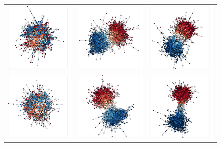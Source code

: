 \documentclass[11pt]{article}
\begin{document}
\begin{center}
\begin{figure}[H]
\begin{tabular}{ccc}
    \includegraphics[width=.15\linewidth]{../plots/networks/network_example_R0.1_4000.pdf} & \includegraphics[width=.15\linewidth]{../plots/networks/network_example_R0.3_4000.pdf} & \includegraphics[width=.15\linewidth]{../plots/networks/network_example_R0.5_4000.pdf}\\ 
    \includegraphics[width=.15\linewidth]{../plots/networks/network_example_R0.1_6000.pdf} & \includegraphics[width=.15\linewidth]{../plots/networks/network_example_R0.3_6000.pdf} & \includegraphics[width=.15\linewidth]{../plots/networks/network_example_R0.5_6000.pdf}\\  

\end{tabular}
\end{figure}
\end{center}
\end{document}
